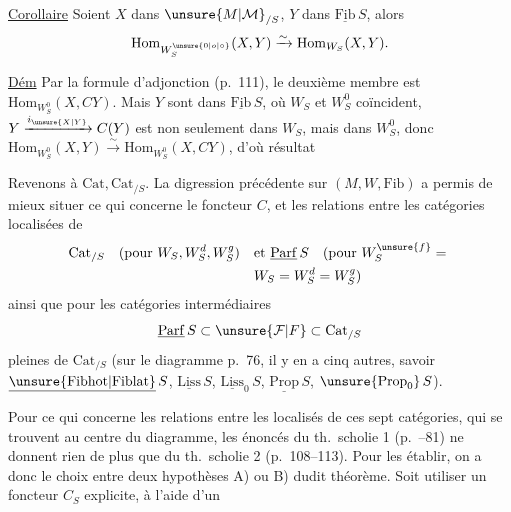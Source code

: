 \uline{Corollaire} Soient $X$ dans $\unsure{M|\mathcal M}_{/S}$, $Y$ dans $\underline{\mathrm{Fib}}\,S$, alors
\[
\mathrm{Hom}_{W_S^{\unsure{0|o|\circ}}}(X,Y)\xrightarrow{\sim}\mathrm{Hom}_{W_S}(X,Y).
\]

\uline{Dém} Par la formule d'adjonction (p.~111), le deuxième membre est \deleted{\unsure{$\simeq$}} $\mathrm{Hom}_{W_S^0}(X,CY)$. Mais  $Y$  sont dans $\underline{\mathrm{Fib}}\,S$, où $W_S$ et $W_S^0$ coïncident, $Y\xrightarrow{i_{\unsure{X|Y}}}C(Y)$ est non seulement dans $W_S$, mais dans $W_S^0$, donc $\mathrm{Hom}_{W_S^0}(X,Y)\xrightarrow{\sim}\mathrm{Hom}_{W_S^0}(X,CY)$, d'où  résultat 


Revenons à $\mathrm{Cat},\mathrm{Cat}_{/S}$. La digression précédente sur $(M,W,\mathrm{Fib})$ a permis de mieux situer ce qui concerne le foncteur $C$, et les relations entre les catégories localisées de
\[
\begin{aligned}
\mathrm{Cat}_{/S}\quad(\text{pour }W_S,W_S^d,W_S^g)\quad&\text{et }\underline{\mathrm{Parf}}\,S\quad(\text{pour }W_S^{\unsure{f}}={}\\
&W_S=W_S^d=W_S^g)
\end{aligned}
\]
ainsi que pour les catégories intermédiaires
\[
\underline{\mathrm{Parf}}\,S\subset\unsure{\mathcal F|F}\subset\mathrm{Cat}_{/S}
\]
pleines de $\mathrm{Cat}_{/S}$ (sur le diagramme p.~76, il y en a cinq autres, savoir $\underline{\unsure{\mathrm{Fibhot}|\mathrm{Fiblat}}}\,S$, $\underline{\mathrm{Liss}}\,S$, $\underline{\mathrm{Liss}}_0\,S$, $\underline{\mathrm{Prop}}\,S$, $\unsure{\mathrm{Prop}_0}\,S$).

Pour ce qui concerne les relations entre les localisés de ces sept catégories, qui se trouvent au centre du diagramme, les énoncés du th.~scholie 1 (p.~--81) ne donnent rien de plus que  du th.~scholie 2 (p.~108--113).  Pour les établir, on a donc le choix entre  deux hypothèses A) ou B) dudit théorème. Soit utiliser un foncteur $C_S$ explicite, à l'aide d'un
